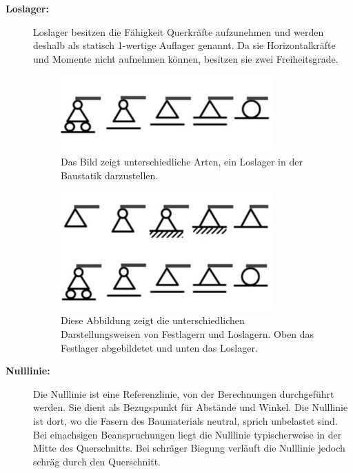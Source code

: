 \begin{description}
\item[\textbf{Loslager:}] Loslager besitzen die Fähigkeit Querkräfte aufzunehmen und werden deshalb als statisch 1-wertige Auflager genannt.
Da sie Horizontalkräfte und Momente nicht aufnehmen können, besitzen sie zwei Freiheitsgrade.
\begin{figure}
	\centering
	\includegraphics[width=0.8\textwidth]{papers/balken/images/teil1/Loslager.jpg}
	\caption{Das Bild zeigt unterschiedliche Arten, ein Loslager in der Baustatik darzustellen.}
	\label{fig:Das Bild zeigt unterschiedliche Arten, ein Loslager in der Baustatik darzustellen.}
\end{figure}
\begin{figure}
\centering
\includegraphics[width=0.8\textwidth]{papers/balken/images/teil1/Gegenueberstellung.png}
\caption{Diese Abbildung zeigt die unterschiedlichen Darstellungsweisen von Festlagern und Loslagern. Oben das Festlager abgebildetet und unten das Loslager.}
\label{fig:Diese Abbildung zeigt die unterschiedlichen Darstellungsweisen von Festlagern und Loslagern. Oben das Festlager abgebildetet und unten das Loslager.}
\end{figure}

\item[\textbf{Nulllinie:}] Die Nulllinie ist eine Referenzlinie, von der Berechnungen durchgeführt werden. Sie dient als Bezugspunkt für Abstände und Winkel.
Die Nulllinie ist dort, wo die Fasern des Baumaterials neutral, sprich unbelastet sind.
Bei einachsigen Beanspruchungen liegt die Nulllinie typischerweise in der Mitte des Querschnitts.
Bei schräger Biegung verläuft die Nulllinie jedoch schräg durch den Querschnitt.


\end{description}
